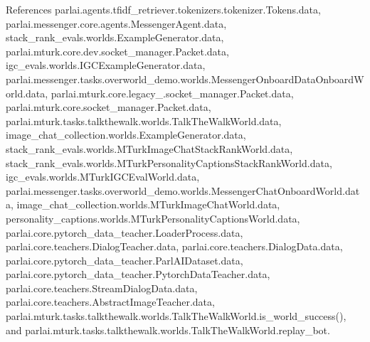 References parlai.\+agents.\+tfidf\+\_\+retriever.\+tokenizers.\+tokenizer.\+Tokens.\+data, parlai.\+messenger.\+core.\+agents.\+Messenger\+Agent.\+data, stack\+\_\+rank\+\_\+evals.\+worlds.\+Example\+Generator.\+data, parlai.\+mturk.\+core.\+dev.\+socket\+\_\+manager.\+Packet.\+data, igc\+\_\+evals.\+worlds.\+I\+G\+C\+Example\+Generator.\+data, parlai.\+messenger.\+tasks.\+overworld\+\_\+demo.\+worlds.\+Messenger\+Onboard\+Data\+Onboard\+World.\+data, parlai.\+mturk.\+core.\+legacy\+\_.\+socket\+\_\+manager.\+Packet.\+data, parlai.\+mturk.\+core.\+socket\+\_\+manager.\+Packet.\+data, parlai.\+mturk.\+tasks.\+talkthewalk.\+worlds.\+Talk\+The\+Walk\+World.\+data, image\+\_\+chat\+\_\+collection.\+worlds.\+Example\+Generator.\+data, stack\+\_\+rank\+\_\+evals.\+worlds.\+M\+Turk\+Image\+Chat\+Stack\+Rank\+World.\+data, stack\+\_\+rank\+\_\+evals.\+worlds.\+M\+Turk\+Personality\+Captions\+Stack\+Rank\+World.\+data, igc\+\_\+evals.\+worlds.\+M\+Turk\+I\+G\+C\+Eval\+World.\+data, parlai.\+messenger.\+tasks.\+overworld\+\_\+demo.\+worlds.\+Messenger\+Chat\+Onboard\+World.\+data, image\+\_\+chat\+\_\+collection.\+worlds.\+M\+Turk\+Image\+Chat\+World.\+data, personality\+\_\+captions.\+worlds.\+M\+Turk\+Personality\+Captions\+World.\+data, parlai.\+core.\+pytorch\+\_\+data\+\_\+teacher.\+Loader\+Process.\+data, parlai.\+core.\+teachers.\+Dialog\+Teacher.\+data, parlai.\+core.\+teachers.\+Dialog\+Data.\+data, parlai.\+core.\+pytorch\+\_\+data\+\_\+teacher.\+Parl\+A\+I\+Dataset.\+data, parlai.\+core.\+pytorch\+\_\+data\+\_\+teacher.\+Pytorch\+Data\+Teacher.\+data, parlai.\+core.\+teachers.\+Stream\+Dialog\+Data.\+data, parlai.\+core.\+teachers.\+Abstract\+Image\+Teacher.\+data, parlai.\+mturk.\+tasks.\+talkthewalk.\+worlds.\+Talk\+The\+Walk\+World.\+is\+\_\+world\+\_\+success(), and parlai.\+mturk.\+tasks.\+talkthewalk.\+worlds.\+Talk\+The\+Walk\+World.\+replay\+\_\+bot.

